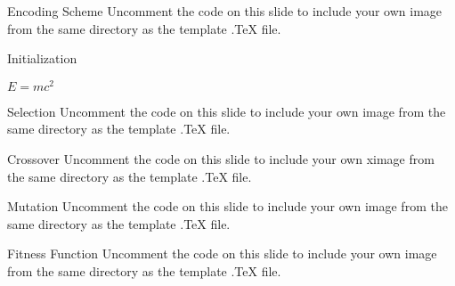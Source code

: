 \documentclass[aspectratio=169,xcolor=dvipsnames]{beamer}
\begin{document}
\begin{frame}{Encoding Scheme}
    Uncomment the code on this slide to include your own image from the same directory as the template .TeX file.
\end{frame}


\begin{frame}{Initialization}
    \begin{theorem}
        $E = mc^2$
    \end{theorem}
\end{frame}


\begin{frame}{Selection}
    Uncomment the code on this slide to include your own image from the same directory as the template .TeX file.
\end{frame}


\begin{frame}{Crossover}
    Uncomment the code on this slide to include your own ximage from the same directory as the template .TeX file.
\end{frame}


\begin{frame}{Mutation}
    Uncomment the code on this slide to include your own image from the same directory as the template .TeX file.
\end{frame}


\begin{frame}{Fitness Function}
    Uncomment the code on this slide to include your own image from the same directory as the template .TeX file.
\end{frame}
\end{document}
